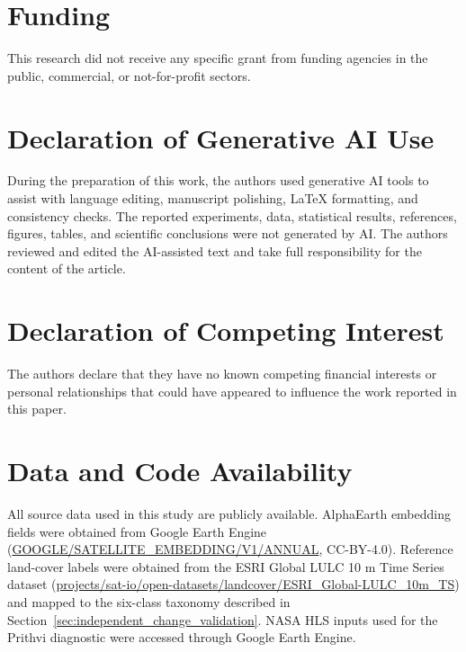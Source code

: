 \documentclass{article}
\begin{document}
\section*{Funding}
This research did not receive any specific grant from funding agencies in the public, commercial, or not-for-profit sectors.

\section*{Declaration of Generative AI Use}
During the preparation of this work, the authors used generative AI tools to assist with language editing, manuscript polishing, LaTeX formatting, and consistency checks. The reported experiments, data, statistical results, references, figures, tables, and scientific conclusions were not generated by AI. The authors reviewed and edited the AI-assisted text and take full responsibility for the content of the article.

\section*{Declaration of Competing Interest}
The authors declare that they have no known competing financial interests or personal relationships that could have appeared to influence the work reported in this paper.

\section*{Data and Code Availability}
All source data used in this study are publicly available. AlphaEarth embedding fields were obtained from Google Earth Engine (\url{GOOGLE/SATELLITE_EMBEDDING/V1/ANNUAL}, CC-BY-4.0). Reference land-cover labels were obtained from the ESRI Global LULC 10 m Time Series dataset (\url{projects/sat-io/open-datasets/landcover/ESRI_Global-LULC_10m_TS}) and mapped to the six-class taxonomy described in Section~\ref{sec:independent_change_validation}. NASA HLS inputs used for the Prithvi diagnostic were accessed through Google Earth Engine.
\end{document}
